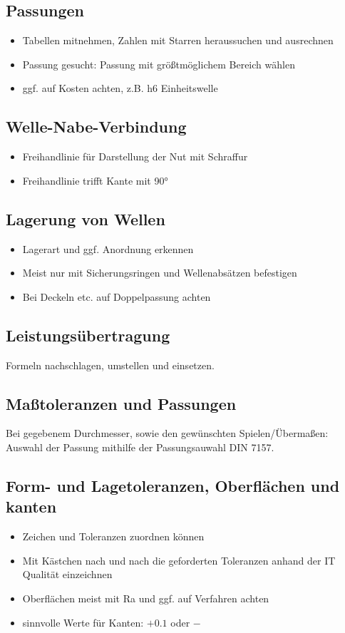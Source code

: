 \documentclass[a4paper,DIV=15,fontsize=11pt]{scrartcl}
\begin{document}
\subsection{Passungen}
\begin{itemize}
	\item Tabellen mitnehmen, Zahlen mit Starren heraussuchen und ausrechnen
	\item Passung gesucht: Passung mit größtmöglichem Bereich wählen
	\item ggf. auf Kosten achten, z.B. h6 Einheitswelle
\end{itemize}

\subsection{Welle-Nabe-Verbindung}
\begin{itemize}
	\item Freihandlinie für Darstellung der Nut mit Schraffur
	\item Freihandlinie trifft Kante mit 90°
\end{itemize}

\subsection{Lagerung von Wellen}
\begin{itemize}
	\item Lagerart und ggf. Anordnung erkennen
	\item Meist nur mit Sicherungsringen und Wellenabsätzen befestigen
	\item Bei Deckeln etc. auf Doppelpassung achten
\end{itemize}

\subsection{Leistungsübertragung}
	Formeln nachschlagen, umstellen und einsetzen.
	
\subsection{Maßtoleranzen und Passungen}
Bei gegebenem Durchmesser, sowie den gewünschten Spielen/Übermaßen: Auswahl der Passung mithilfe der Passungsauwahl DIN 7157.
	
\subsection{Form- und Lagetoleranzen, Oberflächen und kanten}
\begin{itemize}
	\item Zeichen und Toleranzen zuordnen können
	\item Mit Kästchen nach und nach die geforderten Toleranzen anhand der IT Qualität einzeichnen
	\item Oberflächen meist mit Ra und ggf. auf Verfahren achten
	\item sinnvolle Werte für Kanten: $+0.1$ oder $-$
\end{itemize}
	
\end{document}
